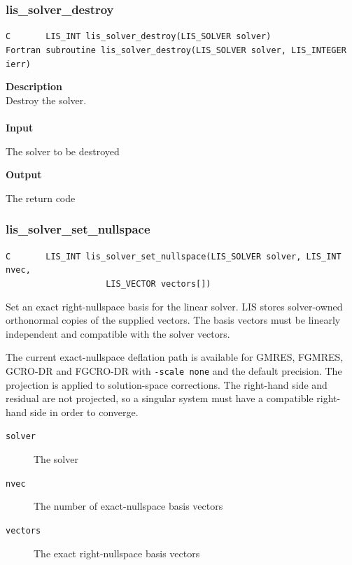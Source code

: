\documentclass[a4paper]{article}
\newcommand{\namelistlabel}[1]{\mbox{#1}\hfill}
\newenvironment{namelist}[1]{%
\begin{list}{}
  {\let\makelabel\namelistlabel
  \settowidth{\labelwidth}{#1}
  \setlength{\leftmargin}{1.1\labelwidth}}
  }{%
\end{list}}
\begin{document}
\subsubsection{lis\_solver\_destroy}
\begin{screen}
\verb|C       LIS_INT lis_solver_destroy(LIS_SOLVER solver)|\\
\verb|Fortran subroutine lis_solver_destroy(LIS_SOLVER solver, LIS_INTEGER ierr)|
\end{screen}
{\bf Description}\\
\indent
Destroy the solver.
\\ \\
\noindent
{\bf Input}
\begin{namelist}{XXXXXXXXXXXXXXXXXXXX}
\item[\tt solver] The solver to be destroyed
\end{namelist}
{\bf Output}
\begin{namelist}{XXXXXXXXXXXXXXXXXXXX}
\item[\tt ierr] The return code
\end{namelist}

\newpage

\subsubsection{lis\_solver\_set\_nullspace}

\verb|C       LIS_INT lis_solver_set_nullspace(LIS_SOLVER solver, LIS_INT nvec,|\\
\verb|                    LIS_VECTOR vectors[])|

Set an exact right-nullspace basis for the linear solver.
LIS stores solver-owned orthonormal copies of the supplied vectors.
The basis vectors must be linearly independent and compatible with the
solver vectors.

The current exact-nullspace deflation path is available for GMRES, FGMRES,
GCRO-DR and FGCRO-DR with \verb|-scale none| and the default precision.  The
projection is applied to solution-space corrections.  The right-hand side
and residual are not projected, so a singular system must have a
compatible right-hand side in order to converge.

\begin{description}
\item[\tt solver] The solver
\item[\tt nvec] The number of exact-nullspace basis vectors
\item[\tt vectors] The exact right-nullspace basis vectors
\end{description}
\end{document}
